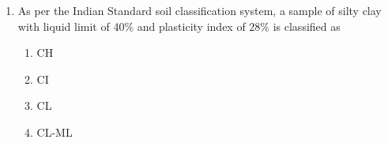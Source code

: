 \documentclass[journal]{IEEEtran}
\begin{document}
\begin{enumerate}
  I The optimum moisture content is expected to be more for the tests with higher energy. II The maximum dry density is expected to be more for the tests with higher energy.
The CORRECT option evaluating the above statements is
\begin{multicols}{1}
			\begin{enumerate}
   \item Only I is TRUE
\item Only II is TRUE
\item Both I and II are TRUE
\item Neither I nor II is TRUE
\end{enumerate}
		\end{multicols}
  \item  As per the Indian Standard soil classification system, a sample of silty clay with liquid limit of 40\% and plasticity index of $28 \%$ is classified as
  \begin{multicols}{1}
			\begin{enumerate}
   \item CH
\item CI
\item CL
\item CL-ML
  \end{enumerate}
		\end{multicols}
 \end{enumerate}
\end{document}
